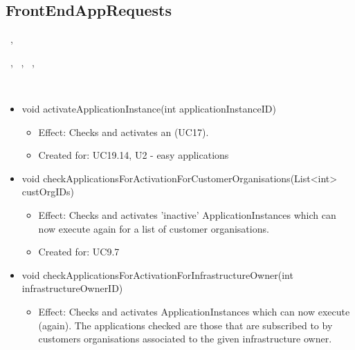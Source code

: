   \subsection{FrontEndAppRequests}\label{int:OnlineServiceOnlineServiceApplicationManagerApplicationManagementLogicFrontEndAppRequests}
    \begin{description}
      \item[Provided by:] \iconcomponent{}~, \iconcomponent{}~
      \item[Required by:] \iconcomponent{}~, \iconcomponent{}~, \iconcomponent{}~, \iconcomponent{}~
      \item[Operations:] ~
    \begin{itemize}[noitemsep,nolistsep,leftmargin=-.25cm]
      \item \textsf{void activateApplicationInstance(int applicationInstanceID)}
        \begin{itemize}[noitemsep,nolistsep]
           \item Effect: Checks and activates an  (UC17).
\item Created for: UC19.14, U2 - easy applications
        \end{itemize}
      \item \textsf{void checkApplicationsForActivationForCustomerOrganisations(List\textless{}int\textgreater{} custOrgIDs)}
        \begin{itemize}[noitemsep,nolistsep]
           \item Effect: Checks and activates 'inactive' ApplicationInstances which can now execute again for a list of customer organisations.
\item Created for: UC9.7
        \end{itemize}
      \item \textsf{void checkApplicationsForActivationForInfrastructureOwner(int infrastructureOwnerID)}
        \begin{itemize}[noitemsep,nolistsep]
           \item Effect: Checks and activates ApplicationInstances which can now execute (again). The applications checked are those that are subscribed to by customers organisations associated to the given infrastructure owner.

\end{itemize}
\end{itemize}
\end{description}
